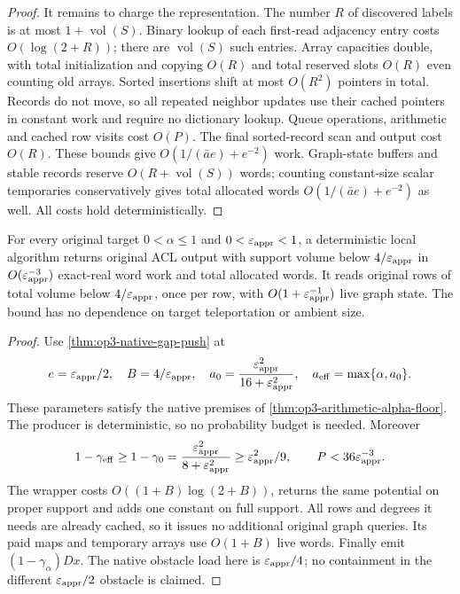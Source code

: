 \begin{proof}
It remains to charge the representation. The number $R$ of discovered
labels is at most $1+\operatorname{vol}(S)$. Binary lookup of each
first-read adjacency entry costs $O(\log(2+R))$; there are
$\operatorname{vol}(S)$ such entries. Array capacities double, with
total initialization and copying $O(R)$ and total reserved slots $O(R)$
even counting old arrays. Sorted insertions shift at most $O(R^2)$
pointers in total. Records do not move, so all repeated neighbor updates
use their cached pointers in constant work and require no dictionary
lookup. Queue operations, arithmetic and cached row visits cost $O(P)$.
The final sorted-record scan and output cost $O(R)$.
These bounds give $O(1/(\bar a e)+e^{-2})$ work. Graph-state buffers
and stable records reserve $O(R+\operatorname{vol}(S))$ words; counting
constant-size scalar temporaries conservatively gives total allocated
words $O(1/(\bar a e)+e^{-2})$ as well. All costs hold deterministically.
\end{proof}

\begin{corollary}
\label{cor:op3-cubic-local-reference}
For every original target $0<\alpha\leq1$ and $0<\varepsilon_{\mathrm{appr}}<1$, a
deterministic local algorithm returns original ACL output with support
volume below $4/\varepsilon_{\mathrm{appr}}$ in $O(\varepsilon_{\mathrm{appr}}^{-3})$ exact-real word work
and total allocated words. It reads original rows of total volume below
$4/\varepsilon_{\mathrm{appr}}$, once per row, with $O(1+\varepsilon_{\mathrm{appr}}^{-1})$ live graph state.
The bound has no dependence on target teleportation or ambient size.
\end{corollary}
\begin{proof}
Use \cref{thm:op3-native-gap-push} at
\[
 e=\varepsilon_{\mathrm{appr}}/2,\quad B=4/\varepsilon_{\mathrm{appr}},\quad
 a_0=\frac{\varepsilon_{\mathrm{appr}}^2}{16+\varepsilon_{\mathrm{appr}}^2},\quad
 a_{\rm eff}=\max\{\alpha,a_0\}.
\]
These parameters satisfy the native premises of
\cref{thm:op3-arithmetic-alpha-floor}. The producer is deterministic,
so no probability budget is needed. Moreover
\[
 1-\gamma_{\rm eff}\geq1-\gamma_0
 =\frac{\varepsilon_{\mathrm{appr}}^2}{8+\varepsilon_{\mathrm{appr}}^2}\geq\varepsilon_{\mathrm{appr}}^2/9,
 \qquad P<36\varepsilon_{\mathrm{appr}}^{-3}.
\]
The wrapper costs $O((1+B)\log(2+B))$, returns the same potential on
proper support and adds one constant on full support. All rows and
degrees it needs are already cached, so it issues no additional original
graph queries. Its paid maps and temporary arrays use $O(1+B)$ live
words. Finally emit $(1-\gamma_\alpha)Dx$. The native obstacle load
here is $\varepsilon_{\mathrm{appr}}/4$; no containment in the different
$\varepsilon_{\mathrm{appr}}/2$ obstacle is claimed.
\end{proof}

